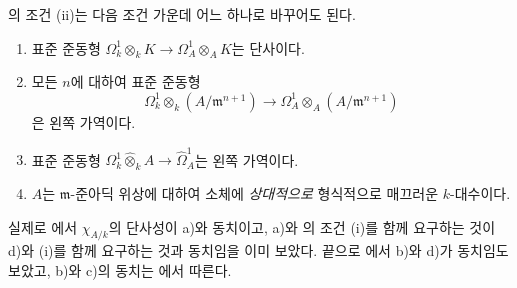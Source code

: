 \begin{remark}[22.2.3]
\label{0.22.2.3-ko}
의 조건 (ii)는 다음 조건 가운데 어느 하나로
바꾸어도 된다.
\begin{enumerate}
  \item[a)] 표준 준동형
  $\Omega^1_k\otimes_kK\to\Omega^1_A\otimes_AK$는 단사이다.
  \item[b)] 모든 $n$에 대하여 표준 준동형
  \[
    \Omega^1_k\otimes_k(A/\mathfrak m^{n+1})
    \longrightarrow
    \Omega^1_A\otimes_A(A/\mathfrak m^{n+1})
  \]
  은 왼쪽 가역이다.
  \item[c)] 표준 준동형
  $\Omega^1_k\widehat\otimes_kA\to\widehat\Omega^1_A$는 왼쪽 가역이다.
  \item[d)] $A$는 $\mathfrak m$-준아딕 위상에 대하여 소체에
  \emph{상대적으로} 형식적으로 매끄러운 $k$-대수이다.
\end{enumerate}
실제로 에서 $\chi_{A/k}$의 단사성이 a)와 동치이고,
a)와 의 조건 (i)를 함께 요구하는 것이 d)와 (i)를
함께 요구하는 것과 동치임을 이미 보았다. 끝으로
에서 b)와 d)가 동치임도 보았고, b)와 c)의 동치는
에서 따른다.
\end{remark}

